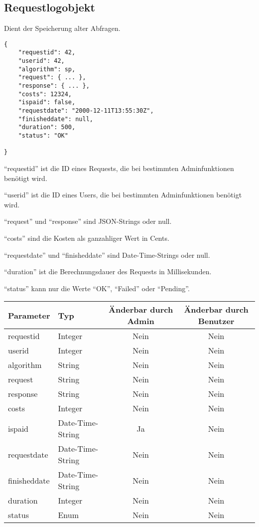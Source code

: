 \documentclass[ngerman,titlepage,parskip=true]{scrartcl}
\begin{document}
	
	
	\subsection{Requestlogobjekt}	
	Dient der Speicherung alter Abfragen.
	\label{requestlogobjekt}

\begin{lstlisting}
{
	"requestid": 42,
	"userid": 42,
	"algorithm": sp,
	"request": { ... },
	"response": { ... },
	"costs": 12324,
	"ispaid": false,
	"requestdate": "2000-12-11T13:55:30Z",
	"finisheddate": null,
	"duration": 500,
	"status": "OK"
	
}
\end{lstlisting}

	``requestid'' ist die ID eines Requests, die bei bestimmten Adminfunktionen benötigt wird.

	``userid'' ist die ID eines Users, die bei bestimmten Adminfunktionen benötigt wird.
	
	``request'' und ``response'' sind JSON-Strings oder null.
	
	``costs'' sind die Kosten als ganzahliger Wert in Cents.

	``requestdate'' und ``finisheddate'' sind Date-Time-Strings oder null.
	
	``duration'' ist die Berechnungsdauer des Requests in Millisekunden.
	
	``status'' kann nur die Werte ``OK'', ``Failed'' oder ``Pending''.
	
	\begin{tabular}{|l|l|c|c|}
	\hline
	Parameter 		& Typ 		& Änderbar durch Admin & Änderbar durch Benutzer \\\hline
	requestid 		& Integer 	& Nein & Nein \\
	userid 			& Integer 	& Nein & Nein \\
	algorithm 		& String 	& Nein & Nein \\
	request 		& String 	& Nein & Nein   \\
	response 		& String 	& Nein & Nein \\
	costs 			& Integer 	& Nein & Nein \\
	ispaid 			& Date-Time-String 	& Ja   & Nein \\
	requestdate 	& Date-Time-String 	& Nein & Nein \\
	finisheddate 	& Date-Time-String	& Nein & Nein \\
	duration 		& Integer 	& Nein & Nein \\
	status 			& Enum 	    & Nein & Nein \\
	\hline
	\end{tabular}	
	
\end{document}
